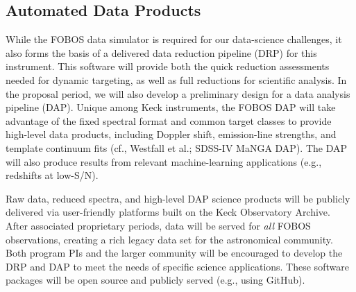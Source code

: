 

\subsection{Automated Data Products}
\label{sec:DAP}

 While the FOBOS data simulator is required for
our data-science challenges, it also forms the basis of a delivered
data reduction pipeline (DRP) for this instrument. This software will
provide both the quick reduction assessments needed for dynamic
targeting, as well as full reductions for scientific analysis. In the
proposal period, we will also develop a preliminary design for a data
analysis pipeline (DAP). Unique among Keck instruments, the FOBOS DAP
will take advantage of the fixed spectral format and common target
classes to provide high-level data products, including Doppler shift,
emission-line strengths, and template continuum fits (cf., Westfall
et al.; SDSS-IV MaNGA DAP). The DAP will also produce results from
relevant machine-learning applications (e.g., redshifts at low-S/N).

Raw data, reduced spectra, and high-level DAP science products will
be publicly delivered via user-friendly platforms built on the Keck
Observatory Archive. After associated proprietary periods, data will
be served for {\it all} FOBOS observations, creating a rich legacy
data set for the astronomical community. Both program PIs and the
larger community will be encouraged to develop the DRP and DAP to
meet the needs of specific science applications. These software
packages will be open source and publicly served (e.g., using
GitHub).
